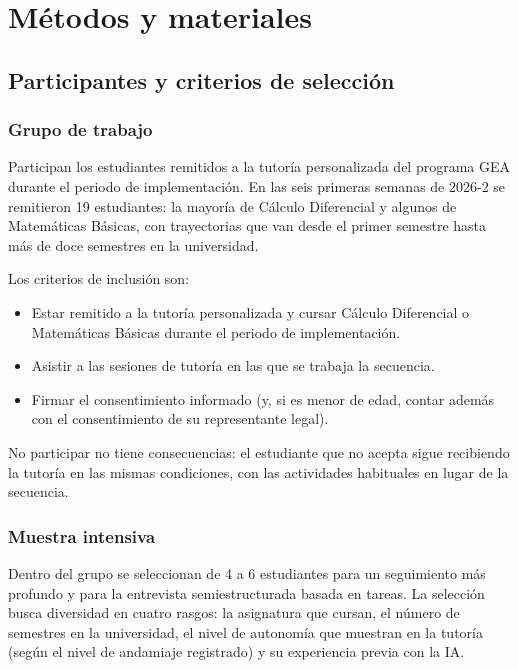 \section{Métodos y materiales}
\label{sec:metodos_materiales}

\subsection{Participantes y criterios de selección}

\subsubsection{Grupo de trabajo}

Participan los estudiantes remitidos a la tutoría personalizada del programa GEA durante el periodo de implementación. En las seis primeras semanas de 2026-2 se remitieron 19 estudiantes: la mayoría de Cálculo Diferencial y algunos de Matemáticas Básicas, con trayectorias que van desde el primer semestre hasta más de doce semestres en la universidad.

Los criterios de inclusión son:

\begin{itemize}
\item Estar remitido a la tutoría personalizada y cursar Cálculo Diferencial o Matemáticas Básicas durante el periodo de implementación.
\item Asistir a las sesiones de tutoría en las que se trabaja la secuencia.
\item Firmar el consentimiento informado (y, si es menor de edad, contar además con el consentimiento de su representante legal).
\end{itemize}

No participar no tiene consecuencias: el estudiante que no acepta sigue recibiendo la tutoría en las mismas condiciones, con las actividades habituales en lugar de la secuencia.

\subsubsection{Muestra intensiva}

Dentro del grupo se seleccionan de 4 a 6 estudiantes para un seguimiento más profundo y para la entrevista semiestructurada basada en tareas. La selección busca diversidad en cuatro rasgos: la asignatura que cursan, el número de semestres en la universidad, el nivel de autonomía que muestran en la tutoría (según el nivel de andamiaje registrado) y su experiencia previa con la IA.

